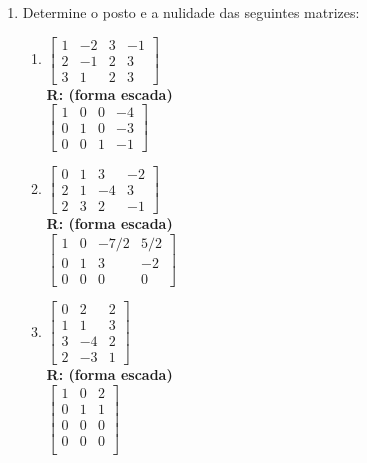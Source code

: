 \documentclass[oneside,a4paper,12pt]{article}
\begin{document}
\begin{enumerate}
	\item Determine o posto e a nulidade das seguintes matrizes:
	\begin{multicols}{3}
		\begin{enumerate}
			\item 	$
			\left[
			\begin{array}{cccc}
			1	&	-2 & 3 & -1 \\
			2 	&	-1 & 2 & 3 \\
			3	&	 1 & 2 & 3 
			\end{array}
			\right]$
			\\ {\bf R: (forma escada) } \\
			$\left[
			\begin{array}{cccc}
			1	&	0 & 0 & -4 \\
			0 	&	1 & 0 & -3 \\
			0	&	0 & 1 & -1 
			\end{array}
			\right]$
			\item 				
			$\left[
			\begin{array}{cccc}
				0	&	1 & 3 & -2 \\
				2 	&	1 & -4 & 3 \\
				2	&	 3 & 2 & -1 
			\end{array}
			\right]$
			\\ {\bf R: (forma escada) } \\
			$\left[
			\begin{array}{cccc}
			1	&	0 & -7/2 & 5/2 \\
			0 	&	1 & 3 & -2 \\
			0	&	0 & 0 & 0 
			\end{array}
			\right]$
			\item 	$
			\left[
			\begin{array}{ccc}
			0	&	2 & 2 \\
			1	&	1 & 3 \\
			3	&	-4 & 2 \\
			2 	& 	-3 &1
			\end{array}
			\right]$
			\\ {\bf R: (forma escada) } \\
			$\left[
			\begin{array}{ccc}
			1	&	0 & 2  \\
			0 	&	1 & 1  \\
			0	&0& 0 \\
			0	&0&0 \\
			\end{array}
			\right]$
		\end{enumerate}
	\end{multicols}
	

\end{enumerate}
\end{document}
